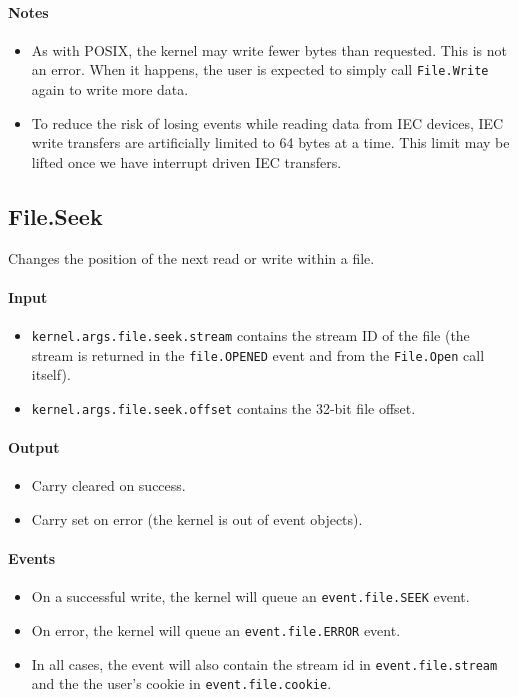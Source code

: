 \paragraph{Notes}
\begin{itemize}
\item As with POSIX, the kernel may write fewer bytes than requested.  This is not an error.  When it happens, the user is expected to simply call \verb+File.Write+ again to write more data.

\item To reduce the risk of losing events while reading data from IEC devices, IEC write transfers are artificially limited to 64 bytes at a time.  This limit may be lifted once we have interrupt driven IEC transfers.
\end{itemize}

\subsection*{File.Seek}
Changes the position of the next read or write within a file.

\paragraph{Input}
\begin{itemize}
\item \verb+kernel.args.file.seek.stream+ contains the stream ID of the file (the stream is returned in the \verb+file.OPENED+ event and from the \verb+File.Open+ call itself).
\item \verb+kernel.args.file.seek.offset+ contains the 32-bit file offset.
\end{itemize}

\paragraph{Output}
\begin{itemize}
\item Carry cleared on success.
\item Carry set on error (the kernel is out of event objects).
\end{itemize}

\paragraph{Events}
\begin{itemize}
\item On a successful write, the kernel will queue an \verb+event.file.SEEK+ event.
\item On error, the kernel will queue an \verb+event.file.ERROR+ event.
\item In all cases, the event will also contain the stream id in \verb+event.file.stream+ and the the user's cookie in \verb+event.file.cookie+.
\end{itemize}

